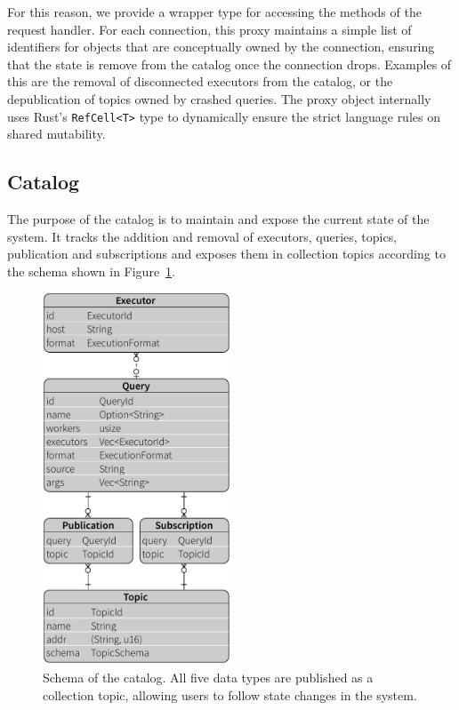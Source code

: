 For this reason, we provide a wrapper type for accessing the methods of the
request handler. For each connection, this proxy maintains a simple list of
identifiers for objects that are conceptually owned by the connection, ensuring that the state is
remove from the catalog once the connection drops. Examples of this are the removal
of disconnected executors from the catalog, or the depublication of topics
owned by crashed queries. The proxy object internally uses Rust's
\lstinline{RefCell<T>} type to dynamically ensure the strict language
rules on shared mutability.

\clearpage

\subsection{Catalog}

The purpose of the catalog is to maintain and expose the current state of the
system. It tracks the addition and removal of executors, queries, topics,
publication and subscriptions and exposes them in collection topics according
to the schema shown in Figure~\ref{fig:model}.

\begin{figure}[htb]
  \centering
    \includegraphics[width=0.5\textwidth]{figures/model}
  \caption[Schema of the catalog.]{Schema of the catalog. All five data types
  are published as a collection topic, allowing users to follow state changes
  in the system.}
  \label{fig:model}
\end{figure}

